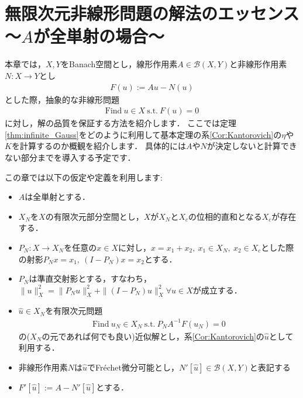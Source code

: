 \chapter{無限次元非線形問題の解法のエッセンス～\texorpdfstring{$A$}{A}が全単射の場合～}\label{sec:infinite_dimensional_nonlinear}
本章では，$X, Y$をBanach空間とし，線形作用素$A \in {\mathcal B}(X, Y)$と非線形作用素$N: X \rightarrow Y$とし
\begin{align*}
	F(u) := A u - N(u)
\end{align*}
とした際，抽象的な非線形問題
\begin{align*}
	\mbox{Find} ~ u \in X ~ \mbox{s.t.} ~ F(u) = 0
\end{align*}
に対し，解の品質を保証する方法を紹介します．
ここでは定理\ref{thm:infinite_Gauss}をどのように利用して基本定理の系\ref{Cor:Kantorovich}の$\eta$や$K$を計算するのか概観を紹介します．
具体的には$A$や$N$が決定しないと計算できない部分までを導入する予定です．

この章では以下の仮定や定義を利用します:
\begin{itemize}
	\item $A$は全単射とする．
	\item $X_N$を$X$の有限次元部分空間とし，$X$が$X_N$と$X_c$の位相的直和となる$X_c$が存在する．
	\item $P_N: X \rightarrow X_N$を任意の$x \in X$に対し，$x = x_1 + x_2, ~ x_1 \in X_N, ~ x_2 \in X_c$とした際の射影$P_N x = x_1, ~ (I - P_N)x = x_2$とする．
	\item $P_N$は準直交射影とする，すなわち，$\| u \|_{X}^2 = \| P_N u \|_X^2 + \| (I - P_N)u \|_{X}^2 \forall u \in X$が成立する．
	\item $\hat{u} \in X_N$を有限次元問題
	\begin{align*}
		\mbox{Find} ~ u_N \in X_N ~ \mbox{s.t.} ~ P_N A^{-1} F( u_N ) = 0
	\end{align*}
	の($X_N$の元であれば何でも良い)近似解とし，系\ref{Cor:Kantorovich}の$\hat{u} $として利用する．
	\item 非線形作用素$N$は$\hat{u}$でFr\'echet微分可能とし，$N'[\hat{u}] \in {\mathcal B}(X,Y)$と表記する
	\item $F'[\hat{u}] := A - N'[\hat{u}]$とする．
\end{itemize}


%
